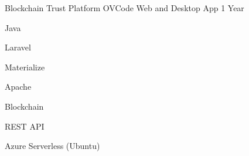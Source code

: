 

\begin{cventries}

  \cventry
    {Blockchain Trust Platform} %
    {OVCode} %
    {Web and Desktop App} %
    {1 Year} %
    {
      \begin{cvitems} %
        \item Java
        \item Laravel
        \item Materialize
        \item Apache
        \item Blockchain
        \item REST API
        \item Azure Serverless (Ubuntu)
      \end{cvitems}
    }

\end{cventries}
